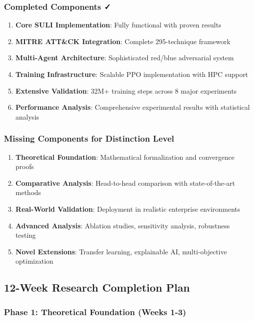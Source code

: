 \documentclass[12pt,a4paper]{article}
\begin{document}
\subsubsection{Completed Components ✓}
\begin{enumerate}
    \item \textbf{Core SULI Implementation}: Fully functional with proven results
    \item \textbf{MITRE ATT\&CK Integration}: Complete 295-technique framework
    \item \textbf{Multi-Agent Architecture}: Sophisticated red/blue adversarial system
    \item \textbf{Training Infrastructure}: Scalable PPO implementation with HPC support
    \item \textbf{Extensive Validation}: 32M+ training steps across 8 major experiments
    \item \textbf{Performance Analysis}: Comprehensive experimental results with statistical analysis
\end{enumerate}

\subsubsection{Missing Components for Distinction Level}
\begin{enumerate}
    \item \textbf{Theoretical Foundation}: Mathematical formalization and convergence proofs
    \item \textbf{Comparative Analysis}: Head-to-head comparison with state-of-the-art methods
    \item \textbf{Real-World Validation}: Deployment in realistic enterprise environments
    \item \textbf{Advanced Analysis}: Ablation studies, sensitivity analysis, robustness testing
    \item \textbf{Novel Extensions}: Transfer learning, explainable AI, multi-objective optimization
\end{enumerate}

\subsection{12-Week Research Completion Plan}

\subsubsection{Phase 1: Theoretical Foundation (Weeks 1-3)}
\end{document}

